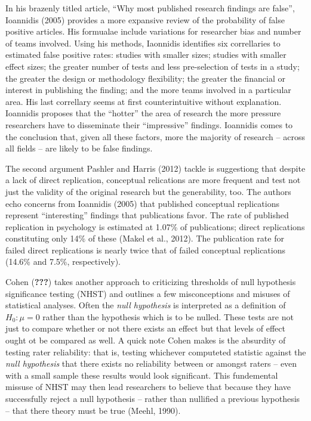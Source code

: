 \documentclass[man]{apa6}
\theoremstyle{definition}
\theoremstyle{definition}
\theoremstyle{definition}
\theoremstyle{remark}
\begin{document}
In his brazenly titled article, \enquote{Why most published research
findings are false}, Ioannidis (2005) provides a more expansive review
of the probability of false positive articles. His formualae include
variations for researcher bias and number of teams involved. Using his
methods, Iaonnidis identifies six correllaries to estimated false
positive rates: studies with smaller sizes; studies with smaller effect
sizes; the greater number of tests and less pre-selection of tests in a
study; the greater the design or methodology flexibility; the greater
the financial or interest in publishing the finding; and the more teams
involved in a particular area. His last correllary seems at first
counterintuitive without explanation. Ioannidis proposes that the
\enquote{hotter} the area of research the more pressure researchers have
to disseminate their \enquote{impressive} findings. Ioannidis comes to
the conclusion that, given all these factors, more the majority of
research -- across all fields -- are likely to be false findings.

The second argument Pashler and Harris (2012) tackle is suggestiong that
despite a lack of direct replication, conceptual relications are more
frequent and test not just the validity of the original research but the
generability, too. The authors echo concerns from Ioannidis (2005) that
published conceptual replications represent \enquote{interesting}
findings that publications favor. The rate of published replication in
psychology is estimated at 1.07\% of publications; direct replications
constituting only 14\% of these (Makel et al., 2012). The publication
rate for failed direct replications is nearly twice that of failed
conceptual replications (14.6\% and 7.5\%, respectively).

Cohen ({\textbf{???}}) takes another approach to criticizing thresholds
of null hypothesis significance testing (NHST) and outlines a few
misconceptions and misuses of statistical analyses. Often the \emph{null
hypothesis} is interpreted as a definition of \(H_0: \mu = 0\) rather
than the hypothesis which is to be nulled. These tests are not just to
compare whether or not there exists an effect but that levels of effect
ought ot be compared as well. A quick note Cohen makes is the absurdity
of testing rater reliability: that is, testing whichever computeted
statistic against the \emph{null hypothesis} that there exists no
reliability between or amongst raters -- even with a small sample these
results would look significant. This fundemental missuse of NHST may
then lead researchers to believe that because they have successfully
reject a null hypothesis -- rather than nullified a previous hypothesis
-- that there theory must be true (Meehl, 1990).
\end{document}
